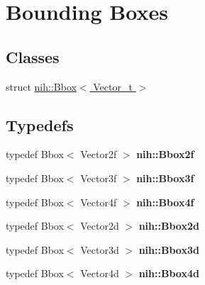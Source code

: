 \hypertarget{group__bboxes}{
\section{\-Bounding \-Boxes}
\label{group__bboxes}
}
\subsection*{\-Classes}
\begin{DoxyCompactItemize}
\item 
struct \hyperlink{structnih_1_1_bbox}{nih\-::\-Bbox$<$ Vector\-\_\-t $>$}
\end{DoxyCompactItemize}
\subsection*{\-Typedefs}
\begin{DoxyCompactItemize}
\item 
\hypertarget{group__bboxes_ga5ebd3a6c3e9a5a8ac883e5a87bf821e6}{
typedef \-Bbox$<$ \-Vector2f $>$ {\bfseries nih\-::\-Bbox2f}}
\label{group__bboxes_ga5ebd3a6c3e9a5a8ac883e5a87bf821e6}

\item 
\hypertarget{group__bboxes_ga4454301371a3ef18876d4c33f9b15418}{
typedef \-Bbox$<$ \-Vector3f $>$ {\bfseries nih\-::\-Bbox3f}}
\label{group__bboxes_ga4454301371a3ef18876d4c33f9b15418}

\item 
\hypertarget{group__bboxes_ga276df7c674fca6914e123dcf4df166ed}{
typedef \-Bbox$<$ \-Vector4f $>$ {\bfseries nih\-::\-Bbox4f}}
\label{group__bboxes_ga276df7c674fca6914e123dcf4df166ed}

\item 
\hypertarget{group__bboxes_ga70a3a6e123309089469f924018908bae}{
typedef \-Bbox$<$ \-Vector2d $>$ {\bfseries nih\-::\-Bbox2d}}
\label{group__bboxes_ga70a3a6e123309089469f924018908bae}

\item 
\hypertarget{group__bboxes_ga073517d49cea29e74f704677e268f215}{
typedef \-Bbox$<$ \-Vector3d $>$ {\bfseries nih\-::\-Bbox3d}}
\label{group__bboxes_ga073517d49cea29e74f704677e268f215}

\item 
\hypertarget{group__bboxes_ga6079eb49bd961dbb56b17e1e657eb2dd}{
typedef \-Bbox$<$ \-Vector4d $>$ {\bfseries nih\-::\-Bbox4d}}
\label{group__bboxes_ga6079eb49bd961dbb56b17e1e657eb2dd}

\end{DoxyCompactItemize}
